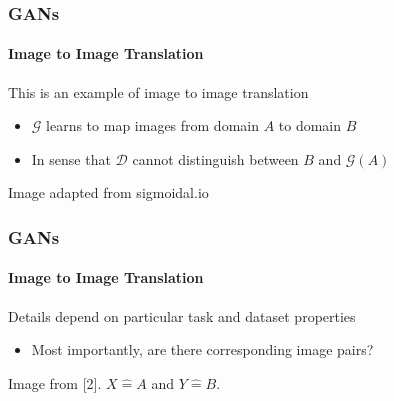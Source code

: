 \documentclass[xetex,professionalfont]{beamer}
\renewcommand\emph[1]{\textcolor{tuwcvl_cvl_blue}{#1}}
\newcommand{\cD}{\mathcal{D}}
\newcommand{\cG}{\mathcal{G}}
\begin{document}
\begin{frame}
	\frametitle{GANs}
	\framesubtitle{Image to Image Translation}

	This is an example of \emph{image to image translation}
	\begin{itemize}
		\item $\cG$ learns to map images from domain $A$ to domain $B$
		\item In sense that $\cD$ cannot distinguish between $B$ and $\cG(A)$ %
	\end{itemize}

	\medskip

	\begin{center}
		{\centering Image adapted from sigmoidal.io}
	\end{center}

\end{frame}


\begin{frame}
	\frametitle{GANs}
	\framesubtitle{Image to Image Translation}

	Details depend on particular task and dataset properties
	\begin{itemize}
		\item Most importantly, are there corresponding image pairs?
	\end{itemize}

	\medskip

	\begin{center}
		{\centering Image from [2]. $X\mathrel{\widehat{=}}A$ and $Y\mathrel{\widehat{=}}B$.}
	\end{center}

\end{frame}
\end{document}
